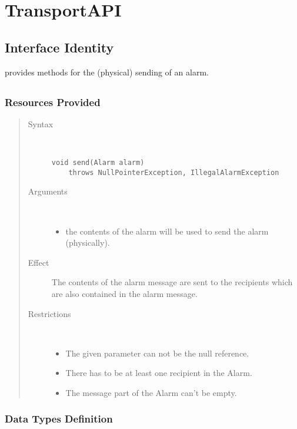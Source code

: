 \section{TransportAPI}
\label{api:notification-unit-transport-api}

\subsection{Interface Identity}

\npar {} provides methods for the (physical) sending of
an alarm.

\subsection{}

\subsubsection{Resources Provided}

\begin{quote}
	\begin{description}
		\item[Syntax] \
		\begin{verbatim}
void send(Alarm alarm)
    throws NullPointerException, IllegalAlarmException
		\end{verbatim}
		\item[Arguments] \
		\begin{itemize}
		  \item the contents of the alarm will be used to send the alarm (physically). 
		\end{itemize}
		\item[Effect] The contents of the alarm message are sent to the recipients
		which are also contained in the alarm message.
		\item[Restrictions] \
		\begin{itemize}
		  \item The given parameter can not be the null reference.
		  \item There has to be at least one recipient in the Alarm.
		  \item The message part of the Alarm can't be empty.
		\end{itemize}
	\end{description} 
\end{quote}

\subsubsection{Data Types Definition}

